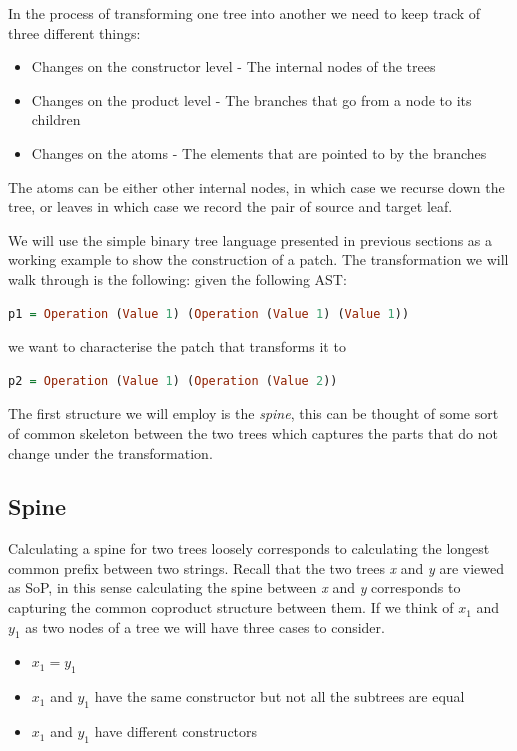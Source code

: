 \documentclass[11pt]{article}
\begin{document}
In the process of transforming one tree into another we need to keep track of three different things: 
\begin{itemize}
  \item Changes on the constructor level - The internal nodes of the trees
  \item Changes on the product level - The branches that go from a node to its children
  \item Changes on the atoms - The elements that are pointed to by the branches
\end{itemize}

The atoms can be either other internal nodes, in which case we recurse down the 
tree, or leaves in which case we record the pair of source and target leaf.

We will use the simple binary tree language presented in previous sections as a 
working example to show the construction of a patch. The transformation we will walk through is the following:
given the following AST:
\begin{lstlisting}[language=haskell]
p1 = Operation (Value 1) (Operation (Value 1) (Value 1))
\end{lstlisting}
we want to characterise the patch that transforms it to 
\begin{lstlisting}[language=haskell]
p2 = Operation (Value 1) (Operation (Value 2))
\end{lstlisting}

The first structure we will employ is the \emph{spine}, this can be thought of some 
sort of common skeleton between the two trees which captures the parts that do 
not change under the transformation.

\subsection{Spine}\label{spine}

Calculating a spine for two trees loosely corresponds to calculating the
longest common prefix between two strings. Recall that the two trees
\emph{x} and \emph{y} are viewed as SoP, in this sense calculating the
spine between \emph{x} and \emph{y} corresponds to capturing the common
coproduct structure between them. If we think of $x_{1}$ and $y_{1}$ as two nodes of a tree we will have three cases to
consider. 
\begin{itemize}
  \item $x_{1} = y_{1}$
  \item $x_{1}$ and $y_{1}$ have the same constructor but not all the
subtrees are equal  
  \item $x_{1}$ and $y_{1}$ have different constructors
\end{itemize}
\end{document}
